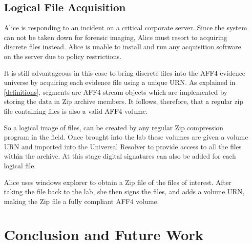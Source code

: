 \documentclass[10pt, conference]{IEEEtran}
\begin{document}
{{%


\subsection{Logical File Acquisition}
Alice is responding to an incident on a critical corporate
server. Since the system can not be taken down for forensic imaging,
Alice must resort to acquiring discrete files instead. Alice is unable
to install and run any acquisition software on the server due to
policy restrictions.

It is still advantageous in this case to bring discrete files into the
AFF4 evidence universe by acquiring each evidence file using a unique
URN. As explained in \ref{definitions}, segments are AFF4 stream
objects which are implemented by storing the data in Zip archive
members. It follows, therefore, that a regular zip file containing
files is also a valid AFF4 volume.

So a logical image of files, can be created by any regular Zip
compression program in the field. Once brought into the lab these
volumes are given a volume URN and imported into the Universal
Resolver to provide access to all the files within the archive. At
this stage digital signatures can also be added for each logical file.

Alice uses windows explorer to obtain a Zip file of the files of
interest. After taking the file back to the lab, she then signs the
files, and adds a volume URN, making the Zip file a fully compliant
AFF4 volume.

\section{Conclusion and Future Work}

}}
\end{document}
